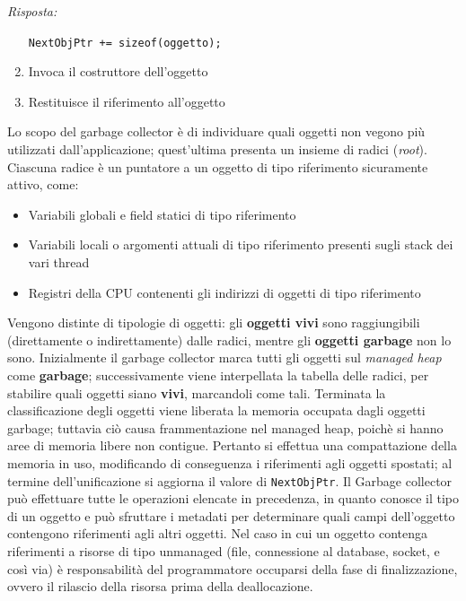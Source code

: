\documentclass{article}
\newenvironment{solution}
    {\textit{Risposta:}}
    {}
\begin{document}
\begin{solution}
\begin{enumerate}
\begin{center}
		\texttt{NextObjPtr += sizeof(oggetto);}

	\end{center}
	\item Invoca il costruttore dell'oggetto
	\item Restituisce il riferimento all'oggetto
\end{enumerate}
Lo scopo del garbage collector è di individuare quali oggetti non vegono più utilizzati dall'applicazione; quest'ultima presenta un insieme di radici (\textit{root}).
Ciascuna radice è un puntatore a un oggetto di tipo riferimento sicuramente attivo, come:
\begin{itemize}
	\item Variabili globali e field statici di tipo riferimento
	\item Variabili locali o argomenti attuali di tipo riferimento presenti sugli stack dei vari thread
	\item Registri della CPU contenenti gli indirizzi di oggetti di tipo riferimento
\end{itemize}
Vengono distinte di tipologie di oggetti: gli \textbf{oggetti vivi} sono raggiungibili (direttamente o indirettamente) dalle radici, mentre gli \textbf{oggetti garbage} non lo sono.
Inizialmente il garbage collector marca tutti gli oggetti sul \textit{managed heap} come \textbf{garbage}; successivamente viene interpellata la tabella delle radici, per stabilire quali oggetti siano \textbf{vivi}, marcandoli come tali.
Terminata la classificazione degli oggetti viene liberata la memoria occupata dagli oggetti garbage; tuttavia ciò causa frammentazione nel managed heap, poichè si hanno aree di memoria libere non contigue.
Pertanto si effettua una compattazione della memoria in uso, modificando di conseguenza i riferimenti agli oggetti spostati; al termine dell'unificazione si aggiorna il valore di \texttt{NextObjPtr}.
Il Garbage collector può effettuare tutte le operazioni elencate in precedenza, in quanto conosce il tipo di un oggetto e può sfruttare i metadati per determinare quali campi dell'oggetto contengono riferimenti agli altri oggetti.
\newline
Nel caso in cui un oggetto contenga riferimenti a risorse di tipo unmanaged (file, connessione al database, socket, e così via) è responsabilità del programmatore occuparsi della fase di finalizzazione, ovvero il rilascio della risorsa prima della deallocazione.
\end{solution}
\end{document}

